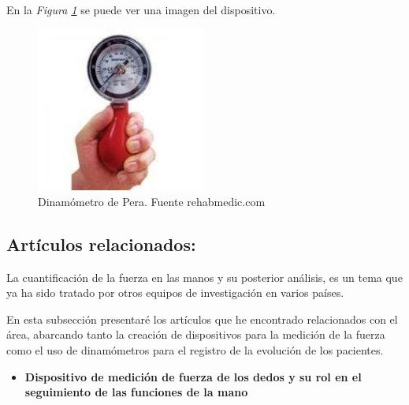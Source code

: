 \begin{itemize}
\begin{itemize}
    En la \textit{Figura \ref{fig:Dinamómetro de Pera}} se puede ver una imagen del dispositivo.
    \begin{figure}[h]
        \centering
        \includegraphics[width=0.5\textwidth]{img/Dinamometro pera.jpeg}
        \caption{Dinamómetro de Pera. Fuente rehabmedic.com}
        \label{fig:Dinamómetro de Pera}
    \end{figure}
\end{itemize}
\subsection{Artículos relacionados:}
La cuantificación de la fuerza en las manos  y su posterior análisis, es un tema que ya ha sido tratado por otros equipos de investigación en varios países. 

En esta subsección presentaré los artículos que he encontrado relacionados con el área, abarcando tanto la creación de dispositivos para la medición de la fuerza como el uso de dinamómetros para el registro de la evolución de los pacientes.
\begin{itemize}
    \item \textbf{Dispositivo de medición de fuerza de los dedos y su
rol en el seguimiento de las funciones de la mano}


\end{itemize}
\end{itemize}
